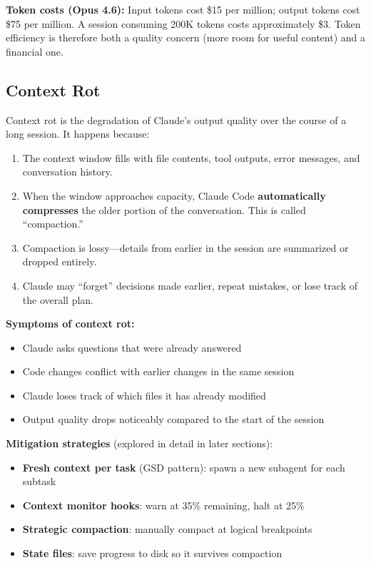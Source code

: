 \documentclass[11pt,a4paper]{article}
\begin{document}
\textbf{Token costs (Opus 4.6):} Input tokens cost \$15 per million; output tokens cost \$75 per million. A session consuming 200K tokens costs approximately \$3. Token efficiency is therefore both a quality concern (more room for useful content) and a financial one.

\subsection{Context Rot}

Context rot is the degradation of Claude's output quality over the course of a long session. It happens because:

\begin{enumerate}
  \item The context window fills with file contents, tool outputs, error messages, and conversation history.
  \item When the window approaches capacity, Claude Code \textbf{automatically compresses} the older portion of the conversation. This is called ``compaction.''
  \item Compaction is lossy---details from earlier in the session are summarized or dropped entirely.
  \item Claude may ``forget'' decisions made earlier, repeat mistakes, or lose track of the overall plan.
\end{enumerate}

\textbf{Symptoms of context rot:}
\begin{itemize}
  \item Claude asks questions that were already answered
  \item Code changes conflict with earlier changes in the same session
  \item Claude loses track of which files it has already modified
  \item Output quality drops noticeably compared to the start of the session
\end{itemize}

\textbf{Mitigation strategies} (explored in detail in later sections):
\begin{itemize}
  \item \textbf{Fresh context per task} (GSD pattern): spawn a new subagent for each subtask
  \item \textbf{Context monitor hooks}: warn at 35\% remaining, halt at 25\%
  \item \textbf{Strategic compaction}: manually compact at logical breakpoints
  \item \textbf{State files}: save progress to disk so it survives compaction
\end{itemize}
\end{document}
